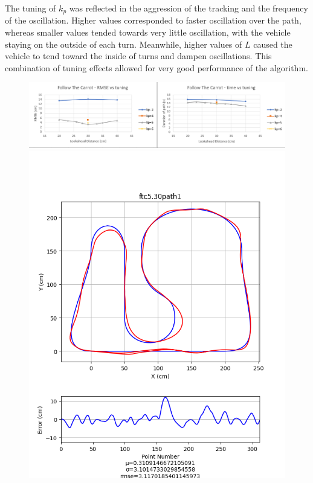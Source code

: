 \documentclass[12pt]{article}
\begin{document}
\begin{flushleft}
The tuning of $k_p$ was reflected in the aggression of the tracking and the frequency of the oscillation. Higher values corresponded to faster oscillation over the path, whereas smaller values tended towards very little oscillation, with the vehicle staying on the outside of each turn. Meanwhile, higher values of $L$ caused the vehicle to tend toward the inside of turns and dampen oscillations. This combination of tuning effects allowed for very good performance of the algorithm.

\begin{figure}[H]
\includegraphics[width=\linewidth]{images/tuningGraphs/ftc}
\includegraphics[width=\linewidth]{images/pathData/ftcpath1}

\end{figure}
\end{flushleft}
\end{document}
